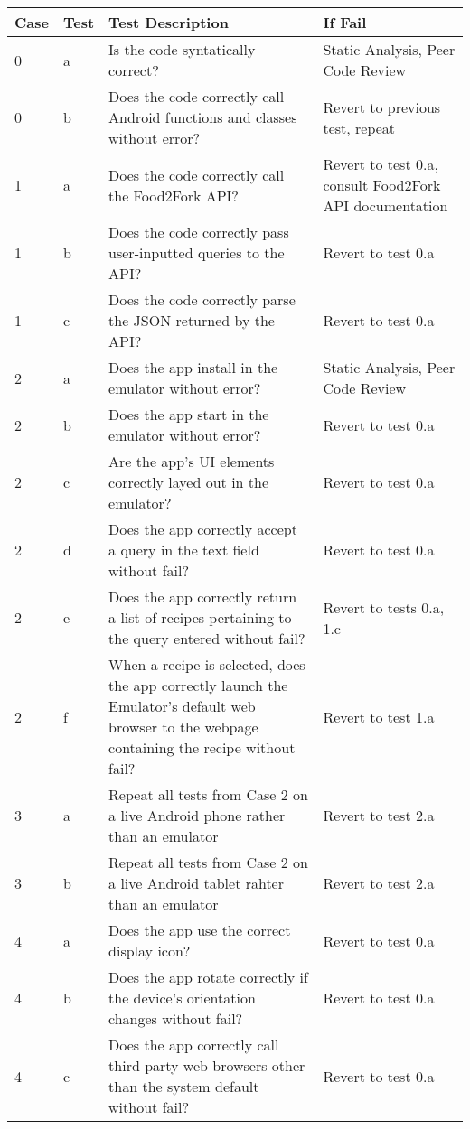 \documentclass[a4paper,11pt]{article}
\begin{document}
\begin{itemize}
\newpage
\begin{center}
	\begin{tabular}{ | l | l | p{2.5in} | p{2.5in} |}
	\hline
	Case 	& Test & Test Description & If Fail	\\	\hline
	0	& a & Is the code syntatically correct? & Static Analysis, Peer Code Review \\ \hline
	0	& b & Does the code correctly call Android functions and classes without error? & Revert to previous test, repeat \\ \hline
	1	& a & Does the code correctly call the Food2Fork API? & Revert to test 0.a, consult Food2Fork API documentation \\ \hline
	1	& b & Does the code correctly pass user-inputted queries to the API? & Revert to test 0.a \\ \hline
	1	& c & Does the code correctly parse the JSON returned by the API? & Revert to test 0.a \\ \hline
	2	& a & Does the app install in the emulator without error? & Static Analysis, Peer Code Review \\ \hline
	2	& b & Does the app start in the emulator without error? & Revert to test 0.a \\ \hline
	2	& c & Are the app's UI elements correctly layed out in the emulator? & Revert to test 0.a \\ \hline
	2	& d & Does the app correctly accept a query in the text field without fail? & Revert to test 0.a \\ \hline
	2	& e & Does the app correctly return a list of recipes pertaining to the query entered without fail? & Revert to tests 0.a, 1.c \\ \hline
	2	& f & When a recipe is selected, does the app correctly launch the Emulator's default web browser to the webpage containing the recipe without fail? & Revert to test 1.a \\ \hline
	3	& a & Repeat all tests from Case 2 on a live Android phone rather than an emulator & Revert to test 2.a \\ \hline
	3	& b & Repeat all tests from Case 2 on a live Android tablet rahter than an emulator & Revert to test 2.a \\ \hline
	4	& a & Does the app use the correct display icon? & Revert to test 0.a \\ \hline
	4	& b & Does the app rotate correctly if the device's orientation changes without fail? & Revert to test 0.a \\ \hline
	4	& c & Does the app correctly call third-party web browsers other than the system default without fail? & Revert to test 0.a \\ \hline
	\end{tabular}
\end{center}

\end{itemize}
\end{document}
